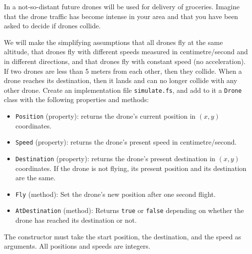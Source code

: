 In a not-so-distant future drones will be used for delivery of
groceries. Imagine that the drone traffic has become intense in your
area and that you have been asked to decide if drones collide.

We will make the simplifying assumptions that all drones
fly at the same altitude, that drones fly with different speeds
measured in centimetre/second and in different directions, and that
drones fly with constant speed (no acceleration). If two drones are
less than 5 meters from each other, then they collide. When a drone
reaches its destination, then it lands and can no longer collide with
any other drone. Create an implementation file
\lstinline{simulate.fs}, and add to it a \lstinline{Drone} class with
the following properties and methods:

\begin{itemize}
\item \lstinline{Position} (property): returns the drone's current
  position in $(x, y)$ coordinates.

\item \lstinline{Speed} (property): returns the drone's present speed
  in centimetre/second.

\item \lstinline{Destination} (property): returns the drone's present
  destination in $(x, y)$ coordinates. If the drone is not flying,
  its present position and its destination are the same.

\item \lstinline{Fly} (method): Set the drone's new position after one
  second flight.

\item \lstinline{AtDestination} (method): Returns \lstinline{true} or
  \lstinline{false} depending on whether the drone has reached its
  destination or not.
\end{itemize}

The constructor must take the start position, the destination, and the speed as arguments.
All positions and speeds are integers.

